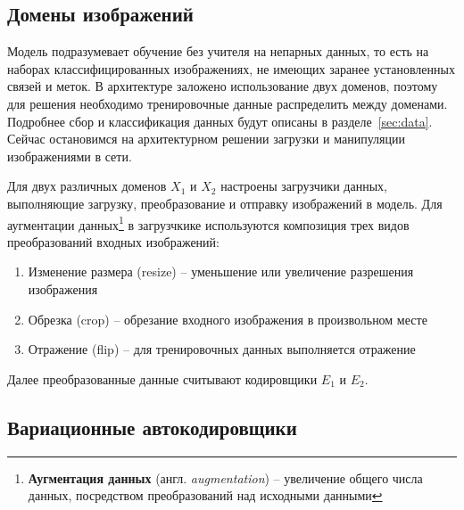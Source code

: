 \documentclass[11pt,a4paper]{extarticle}
\begin{document}
{		\subsection{Домены изображений}\label{sec:model:domains}
			
			Модель подразумевает обучение без учителя на непарных данных, то есть на наборах классифицированных изображениях, не имеющих заранее установленных связей и меток.
			В архитектуре заложено использование двух доменов, поэтому для решения необходимо тренировочные данные распределить между доменами.
			Подробнее сбор и классификация данных будут описаны в разделе~\ref{sec:data}. Сейчас остановимся на архитектурном решении загрузки и манипуляции изображениями в сети.

			Для двух различных доменов \(X_1\) и \(X_2\) настроены загрузчики данных, выполняющие загрузку, преобразование и отправку изображений в модель.
			Для аугментации данных\footnote{
				\textbf{Аугментация данных} (англ. \textit{augmentation}) -- увеличение общего числа данных, посредством преобразований над исходными данными 
			}
			в загрузчкике используются композиция трех видов преобразований входных изображений:

			\begin{enumerate}
				\item Изменение размера (resize) -- уменьшение или увеличение разрешения изображения
				\item Обрезка (crop) -- обрезание входного изображения в произвольном месте
				\item Отражение (flip) -- для тренировочных данных выполняется отражение
			\end{enumerate}
			\noindent
			Далее преобразованные данные считывают кодировщики \(E_1\) и \(E_2\).

		\subsection{Вариационные автокодировщики}\label{sec:model:vae}

}
\end{document}
